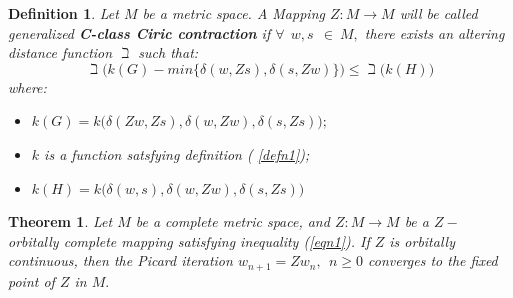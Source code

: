 \documentclass[10pt,a4paper]{amsart}
\newtheorem{definition}{Definition}
\newtheorem{theorem}{Theorem}
\begin{document}
	\begin{definition}\label{defn2}
		Let $M$ be a metric space. A Mapping $Z: M \to M$ will be called generalized  \textbf{C-class Ciric contraction} if $\forall~~w,s~~\in~M,$ there exists an altering distance function $\beth$ such that:
		\begin{equation}\label{eqn1}
			\beth \Big(k(G)- min\{\delta(w,Zs), \delta(s, Zw)\}\Big) \leq \beth\Big(k(H)\Big)
		\end{equation}
		where:
		\begin{itemize}
			\item $k(G) = k\Big( \delta(Zw,Zs), \delta(w,Zw), \delta(s, Zs)\Big);$
			\item $k$ is a function satsfying definition ( \ref{defn1});
			\item $k(H)= k\Big(\delta(w,s), \delta(w,Zw), \delta(s,Zs) \Big)$
		\end{itemize}
	\end{definition}

	\begin{theorem}\label{maintheorem}
		Let $M$ be a complete metric space, and $Z: M \to M$ be a $Z-$ orbitally complete mapping satisfying inequality (\ref{eqn1}). If $Z$ is orbitally continuous, then the Picard iteration $w_{n+1} = Zw_n,~~n \geq 0$ converges to the fixed point of $Z$ in $M.$
	\end{theorem}
\end{document}
